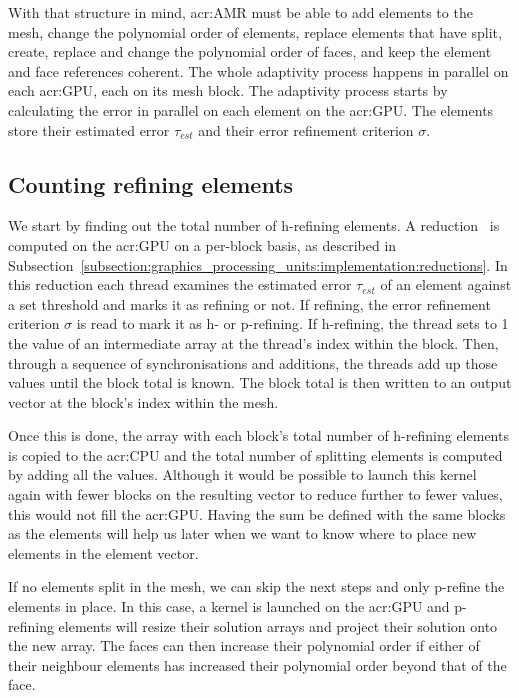 With that structure in mind, \acrlong{acr:AMR} must be able to add elements to the mesh, change the
polynomial order of elements, replace elements that have split, create, replace and change the
polynomial order of faces, and keep the element and face references coherent. The whole adaptivity
process happens in parallel on each \acrshort{acr:GPU}, each on its mesh block. The adaptivity
process starts by calculating the error in parallel on each element on the \acrshort{acr:GPU}. The
elements store their estimated error \(\tau_{est}\) and their error refinement criterion \(\sigma
\).

\subsection{Counting refining elements}\label{subsection:adaptive_mesh_refinement:implementation:counting_refining_elements}

We start by finding out the total number of h-refining elements. A reduction~\cite{Harris2007} is
computed on the \acrshort{acr:GPU} on a per-block basis, as described in
Subsection~\ref{subsection:graphics_processing_units:implementation:reductions}. In this reduction
each thread examines the estimated error \(\tau_{est}\) of an element against a set threshold and
marks it as refining or not. If refining, the error refinement criterion \(\sigma \) is read to mark
it as h- or p-refining. If h-refining, the thread sets to 1 the value of an intermediate array at the
thread's index within the block. Then, through a sequence of synchronisations and additions, the
threads add up those values until the block total is known. The block total is then written to an
output vector at the block's index within the mesh.

Once this is done, the array with each block's total number of h-refining elements is copied to the
\acrshort{acr:CPU} and the total number of splitting elements is computed by adding all the values.
Although it would be possible to launch this kernel again with fewer blocks on the resulting vector
to reduce further to fewer values, this would not fill the \acrshort{acr:GPU}. Having the sum be
defined with the same blocks as the elements will help us later when we want to know where to place
new elements in the element vector.

If no elements split in the mesh, we can skip the next steps and only p-refine the elements in
place. In this case, a kernel is launched on the \acrshort{acr:GPU} and p-refining elements will
resize their solution arrays and project their solution onto the new array. The faces can then
increase their polynomial order if either of their neighbour elements has increased their polynomial
order beyond that of the face.


